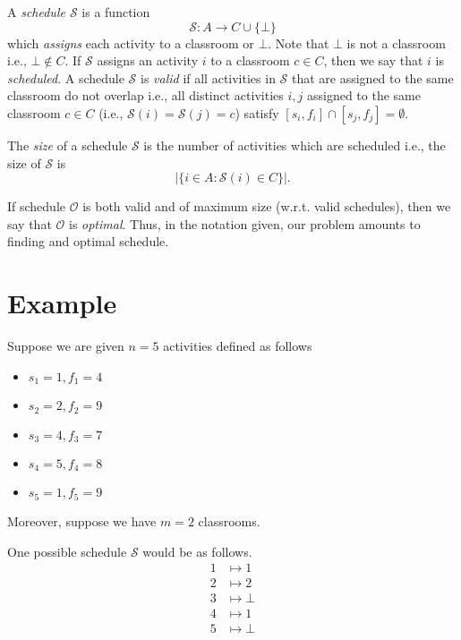 \documentclass{article}
\theoremstyle{plain}%
\theoremstyle{definition}
\theoremstyle{remark}
\begin{document}
A \emph{schedule $\mathcal{S}$} is a function
\[
    \mathcal{S} : A \to  C \cup \{ \bot \}
\]
which \emph{assigns} each activity to a classroom or $\bot$.
Note that $\bot$ is not a classroom i.e., $\bot \not \in C$.
If $\mathcal{S}$ assigns an activity $i$ to a classroom $c \in C$, then we say
    that $i$ is \emph{scheduled}.
A schedule $\mathcal{S}$ is \emph{valid} if
    all activities in $\mathcal{S}$ that are assigned to the same classroom do not overlap  i.e.,
        all distinct activities $i,j$ assigned to the same classroom $c \in C$ (i.e., $\mathcal{S}(i) = \mathcal{S}(j) = c$)
            satisfy $[s_i,f_i] \cap [s_j,f_j] = \emptyset$.

The \emph{size} of a schedule $\mathcal{S}$ is
    the number of activities which are scheduled i.e., the size of $\mathcal{S}$ is 
\begin{equation}
    | \{ i \in A : \mathcal{S}(i) \in C \}|
    .
\end{equation}

If schedule $\mathcal{O}$ is both valid and of maximum size
    (w.r.t. valid schedules), then we say that 
    $\mathcal{O}$ is \emph{optimal}. 
Thus, in the notation given, our problem amounts to finding and optimal
    schedule.

\section{Example}
Suppose we are given $n = 5$ activities defined as follows
\begin{itemize}
    \item $s_1 = 1, f_1 = 4$
    \item $s_2 = 2, f_2 = 9$
    \item $s_3 = 4, f_3 = 7$
    \item $s_4 = 5, f_4 = 8$
    \item $s_5 = 1, f_5 = 9$
\end{itemize}
Moreover, suppose we have $m = 2$ classrooms.

One possible schedule $\mathcal{S}$ would be as follows.
\begin{align}
    1 &\mapsto 1    \\
    2 &\mapsto 2    \\
    3 &\mapsto \bot \\
    4 &\mapsto 1    \\
    5 &\mapsto \bot \\
\end{align}
\end{document}
